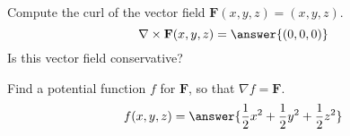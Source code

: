 \begin{problem}
Compute the curl of the vector field $\mathbf{F}(x,y,z) = (x,y,z)$.
\[
\nabla\times\mathbf{F}(x,y,z) = \answer{(0,0,0)}
\]
Is this vector field conservative?
\begin{multipleChoice}
\end{multipleChoice}
\begin{problem}
Find a potential function $f$ for $\mathbf{F}$, so that $\nabla f = \mathbf{F}$.
\[
f(x,y,z) = \answer{\frac{1}{2}x^2+\frac{1}{2}y^2+\frac{1}{2}z^2}
\]
\end{problem}
\end{problem}